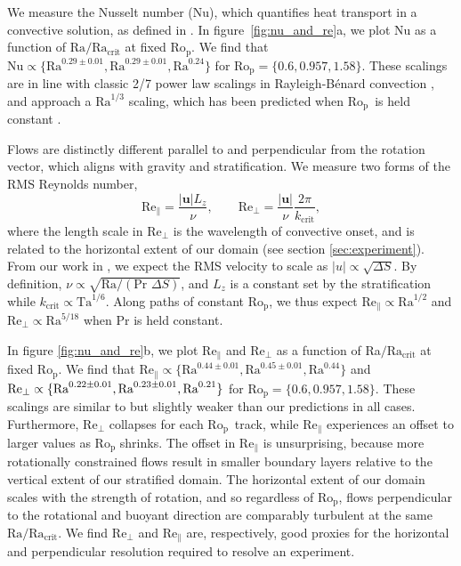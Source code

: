 \documentclass[twocolumn, amsmath, amsfonts, amssymb, trackchanges]{aastex62}
\newcommand{\RB}{Rayleigh-B\'{e}nard }
\newcommand{\pro}{\ensuremath{\text{Ro}_{\text{p}}}}
\begin{document}
We measure the Nusselt number (Nu), which quantifies heat transport in a convective
solution, as defined in \AB.
In figure~\ref{fig:nu_and_re}a, we plot Nu as a function
of $\text{Ra}/\text{Ra}_\text{crit}$ at fixed \pro. We find that $\text{Nu} \propto \{\text{Ra}^{0.29 \pm 0.01}, \text{Ra}^{0.29 \pm 0.01}, \text{Ra}^{0.24}\}$
for $\pro = \{0.6, 0.957, 1.58\}$. These scalings are in line with classic 2/7 power law scalings
in \RB convection \citep{ahlers&all2009}, and approach a $\text{Ra}^{1/3}$ scaling, 
which has been predicted when \pro$\,$ is held constant
\citep[see][and section \ref{sec:discussion}]{king&all2012}.

Flows are distinctly different parallel to and perpendicular
from the rotation vector, which aligns with gravity and stratification.
We measure two forms of the RMS Reynolds number,
\begin{equation}
\text{Re}_{\parallel} = \frac{|\bm{u}| L_z}{\nu}, \qquad
\text{Re}_{\perp}     = \frac{|\bm{u}|}{\nu}\frac{2\pi}{k_{\text{crit}}},
\label{eqn:re_defn}
\end{equation}
where the length scale in $\text{Re}_{\perp}$ is the wavelength of convective onset, and is
related to the horizontal extent of our domain (see section \ref{sec:experiment}).
From our work in \AB, we expect the RMS velocity to scale as $|u| \propto \sqrt{\Delta S}$.
By definition, $\nu \propto \sqrt{\text{Ra}/(\text{Pr }\Delta S)}$, and $L_z$ is a constant
set by the stratification while $k_{\text{crit}} \propto \text{Ta}^{1/6}$. Along paths of
constant \pro, we thus expect $\text{Re}_{\parallel} \propto \text{Ra}^{1/2}$ and
$\text{Re}_{\perp} \propto \text{Ra}^{5/18}$ when $\text{Pr}$ is held constant.

In figure \ref{fig:nu_and_re}b, we plot $\text{Re}_{\parallel}$ and $\text{Re}_{\perp}$
as a function of Ra$/\text{Ra}_{\text{crit}}$ at fixed \pro. We find that $\text{Re}_\parallel \propto \{\text{Ra}^{0.44 \pm 0.01}, \text{Ra}^{0.45 \pm 0.01}, \text{Ra}^{0.44}\}$
and $\text{Re}_\perp \propto \{\text{Ra}^{0.22 \pm 0.01}, \\ \text{Ra}^{0.23 \pm 0.01}, \text{Ra}^{0.21}\}$ for
$\pro = \{0.6, 0.957, 1.58\}$. These scalings are similar to but slightly weaker than our
predictions in all cases. Furthermore, $\text{Re}_{\perp}$ collapses for each $\pro\,$ track,
while $\text{Re}_{\parallel}$ experiences an offset
to larger values as $\pro$ shrinks. The offset in $\text{Re}_{\parallel}$ is unsurprising, 
because more rotationally constrained flows result in smaller boundary layers relative to the 
vertical extent of our stratified domain. The horizontal extent of our domain scales with the
strength of rotation, and so regardless of \pro, flows perpendicular
to the rotational and buoyant direction are comparably turbulent at the same 
$\text{Ra}/\text{Ra}_\text{crit}$.
We find $\text{Re}_{\perp}$ and $\text{Re}_{\parallel}$ are, respectively, good proxies for
the horizontal and perpendicular resolution required to resolve an experiment.
\end{document}
